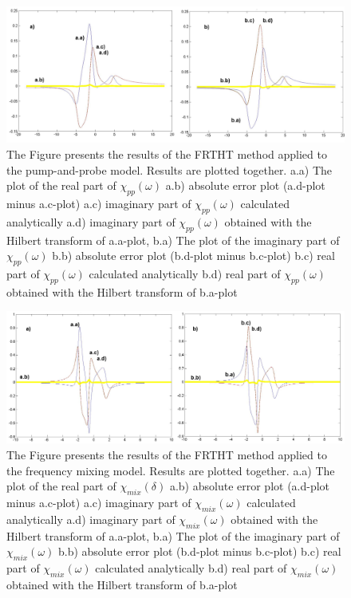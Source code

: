 \documentclass[12pt,twoside,a4paper]{article}
\numberwithin{equation}{subsection}
\numberwithin{figure}{subsection}
\begin{document}
\begin{figure} 
  \includegraphics[width=150mm]{img/fht_pnp.png}
  \caption{The Figure presents the results of the FRTHT method applied to the pump-and-probe model. Results are
  plotted together.
     a.a) The plot of the real part of ${\chi_{pp}}(\omega )$
     a.b) absolute error plot (a.d-plot minus a.c-plot) 
     a.c) imaginary part of $\chi_{pp}(\omega )$ calculated analytically 
     a.d) imaginary part of $\chi_{pp}(\omega )$ obtained with the Hilbert transform of a.a-plot, 
     b.a) The plot of the imaginary part of $\chi_{pp}(\omega )$ 
     b.b) absolute error plot (b.d-plot minus b.c-plot) 
     b.c) real part of $\chi_{pp} (\omega )$ calculated analytically 
     b.d) real part of $\chi_{pp} (\omega )$ obtained with the Hilbert transform of b.a-plot 
     \label{fig:fht_pnp}
     }
\end{figure} 

\begin{figure} 
  \includegraphics[width=150mm]{img/fht_fmix.png}
  \caption{The Figure presents the results of the FRTHT method applied to the frequency mixing model. Results are
  plotted together.
     a.a) The plot of the real part of ${\chi_{mix}}(\delta )$
     a.b) absolute error plot (a.d-plot minus a.c-plot) 
     a.c) imaginary part of $\chi_{mix}(\omega )$ calculated analytically 
     a.d) imaginary part of $\chi_{mix}(\omega )$ obtained with the Hilbert transform of a.a-plot, 
     b.a) The plot of the imaginary part of $\chi_{mix}(\omega )$ 
     b.b) absolute error plot (b.d-plot minus b.c-plot) 
     b.c) real part of $\chi_{mix} (\omega )$ calculated analytically 
     b.d) real part of $\chi_{mix} (\omega )$ obtained with the Hilbert transform of b.a-plot 
     \label{fig:fht_fmix}
     }
\end{figure}
\end{document}
